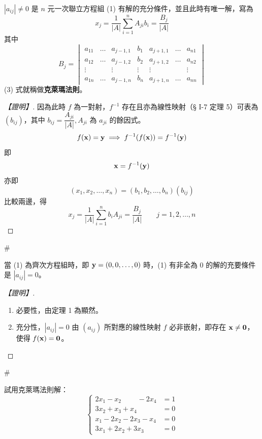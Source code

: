 \begin{theorem}\label{thm:b6s-1-22}
$|a_{ij}| \ne 0$ 是 $n$ 元一次聯立方程組 (1) 有解的充分條件，並且此時有唯一解，寫為
\begin{equation}
x_j = \dfrac{1}{|A|} \sum_{i=1}^n A_{ji} b_i = \dfrac{B_j}{|A|} \label{eq:b6s-1-8-3}
\end{equation}
其中
\[ B_j = \begin{vmatrix}
a_{11} & \dots & a_{j-1,1} & b_1 & a_{j+1,1} & \dots & a_{n1} \\
a_{12} & \dots & a_{j-1,2} & b_2 & a_{j+1,2} & \dots & a_{n2} \\
\vdots & & \vdots & \vdots & \vdots & & \vdots \\
a_{1n} & \dots & a_{j-1,n} & b_n & a_{j+1,n} & \dots & a_{nn}
\end{vmatrix} \]
(3) 式就稱做\textbf{克萊瑪法則}。
\end{theorem}

\begin{proof}[【證明】]
因為此時 $f$ 為一對射，$f^{-1}$ 存在且亦為線性映射（§ I-7 定理 5）可表為 $(b_{ij})$，其中 $b_{ij} = \dfrac{A_{ji}}{|A|}, A_{ji}$ 為 $a_{ji}$ 的餘因式。
\[ f(\boldsymbol{\mathbf{x}}) = \boldsymbol{\mathbf{y}} \implies f^{-1}(f(\boldsymbol{\mathbf{x}})) = f^{-1}(\boldsymbol{\mathbf{y}}) \]
即
\[ \boldsymbol{\mathbf{x}} = f^{-1}(\boldsymbol{\mathbf{y}}) \]
亦即
\[ (x_1, x_2, \dots, x_n) = (b_1, b_2, \dots, b_n)(b_{ij}) \]
比較兩邊，得
\[ x_j = \dfrac{1}{|A|} \sum_{i=1}^n b_i A_{ji} = \dfrac{B_j}{|A|} \qquad j=1, 2, \dots, n \]
\end{proof}\hfill$\#$

\begin{corollary}\label{cor:b6s-1-6}
當 (1) 為齊次方程組時，即 $\boldsymbol{\mathbf{y}}=(0, 0, \dots, 0)$ 時，(1) 有非全為 0 的解的充要條件是 $|a_{ij}| = 0$。
\end{corollary}

\begin{proof}[【證明】]
\begin{enumerate}[label=(\roman*), leftmargin=2em]
  \item 必要性，由定理 1 為顯然。
  \item 充分性，$|a_{ij}| = 0$ 由 $(a_{ij})$ 所對應的線性映射 $f$ 必非嵌射，即存在 $\boldsymbol{\mathbf{x}} \ne \boldsymbol{\mathbf{0}}$，使得 $f(\boldsymbol{\mathbf{x}}) = \boldsymbol{\mathbf{0}}$。
\end{enumerate}
\end{proof}\hfill$\#$

\begin{example}\label{ex:b6s-1-41}
試用克萊瑪法則解：
\[ \left\{\begin{aligned}
2x_1 - x_2 \phantom{+ 2x_3} - 2x_4 &= 1 \\
3x_2 + x_3 + x_4 &= 0 \\
x_1 - 2x_2 - 2x_3 - x_4 &= 0 \\
3x_1 + 2x_2 + 3x_3 \phantom{+ x_4} &= 0
\end{aligned}\right. \]
\end{example}

